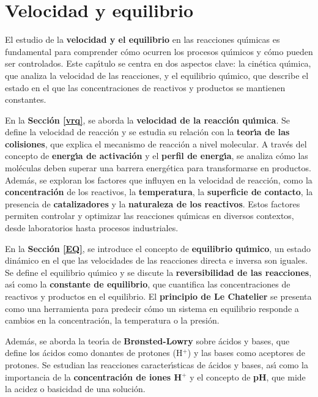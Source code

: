 \chapter{Velocidad y equilibrio}

El estudio de la \textbf{velocidad y el equilibrio} en las reacciones qu\'{\i}micas es fundamental para comprender c\'omo ocurren los procesos qu\'{\i}micos y c\'omo pueden ser controlados. Este cap\'{\i}tulo se centra en dos aspectos clave: la cin\'etica qu\'{\i}mica, que analiza la velocidad de las reacciones, y el equilibrio qu\'{\i}mico, que describe el estado en el que las concentraciones de reactivos y productos se mantienen constantes.

En la \textbf{Secci\'on \ref{vrq}}, se aborda la \textbf{velocidad de la reacci\'on qu\'{\i}mica}. Se define la velocidad de reacci\'on y se estudia su relaci\'on con la \textbf{teor\'{\i}a de las colisiones}, que explica el mecanismo de reacci\'on a nivel molecular. A trav\'es del concepto de \textbf{energ\'{\i}a de activaci\'on} y el \textbf{perfil de energ\'{\i}a}, se analiza c\'omo las mol\'eculas deben superar una barrera energ\'etica para transformarse en productos. Adem\'as, se exploran los factores que influyen en la velocidad de reacci\'on, como la \textbf{concentraci\'on} de los reactivos, la \textbf{temperatura}, la \textbf{superficie de contacto}, la presencia de \textbf{catalizadores} y la \textbf{naturaleza de los reactivos}. Estos factores permiten controlar y optimizar las reacciones qu\'{\i}micas en diversos contextos, desde laboratorios hasta procesos industriales.

En la \textbf{Secci\'on \ref{EQ}}, se introduce el concepto de \textbf{equilibrio qu\'{\i}mico}, un estado din\'amico en el que las velocidades de las reacciones directa e inversa son iguales. Se define el equilibrio qu\'{\i}mico y se discute la \textbf{reversibilidad de las reacciones}, as\'{\i} como la \textbf{constante de equilibrio}, que cuantifica las concentraciones de reactivos y productos en el equilibrio. El \textbf{principio de Le Chatelier} se presenta como una herramienta para predecir c\'omo un sistema en equilibrio responde a cambios en la concentraci\'on, la temperatura o la presi\'on.

Adem\'as, se aborda la teor\'{\i}a de \textbf{Brønsted-Lowry} sobre \'acidos y bases, que define los \'acidos como donantes de protones (H$^+$) y las bases como aceptores de protones. Se estudian las reacciones caracter\'{\i}sticas de \'acidos y bases, as\'{\i} como la importancia de la \textbf{concentraci\'on de iones H$^+$} y el concepto de \textbf{pH}, que mide la acidez o basicidad de una soluci\'on.

